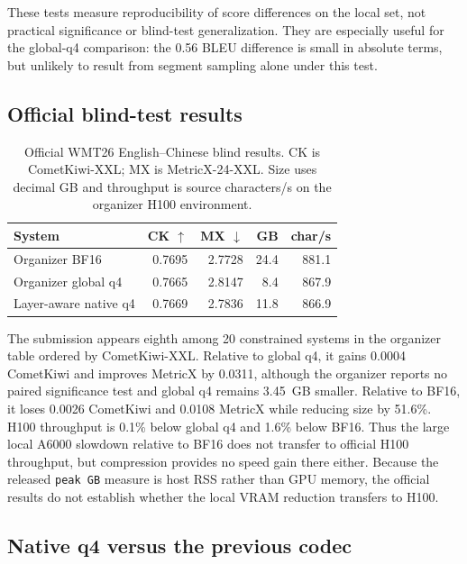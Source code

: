 \documentclass[11pt]{article}
\begin{document}
These tests measure reproducibility of score differences on the local set, not practical significance or blind-test generalization. They are especially useful for the global-q4 comparison: the 0.56 BLEU difference is small in absolute terms, but unlikely to result from segment sampling alone under this test.

\subsection{Official blind-test results}
\label{sec:official-results}

\begin{table}[t]
\centering
\small
\begin{tabular}{@{}lrrrr@{}}
\toprule
System & CK $\uparrow$ & MX $\downarrow$ & GB & char/s \\
\midrule
Organizer BF16 & 0.7695 & 2.7728 & 24.4 & 881.1 \\
Organizer global q4 & 0.7665 & 2.8147 & 8.4 & 867.9 \\
Layer-aware native q4 & 0.7669 & 2.7836 & 11.8 & 866.9 \\
\bottomrule
\end{tabular}
\caption{Official WMT26 English--Chinese blind results. CK is CometKiwi-XXL; MX is MetricX-24-XXL. Size uses decimal GB and throughput is source characters/s on the organizer H100 environment.}
\label{tab:official-results}
\end{table}

The submission appears eighth among 20 constrained systems in the organizer table ordered by CometKiwi-XXL. Relative to global q4, it gains 0.0004 CometKiwi and improves MetricX by 0.0311, although the organizer reports no paired significance test and global q4 remains 3.45~GB smaller. Relative to BF16, it loses 0.0026 CometKiwi and 0.0108 MetricX while reducing size by 51.6\%. H100 throughput is 0.1\% below global q4 and 1.6\% below BF16. Thus the large local A6000 slowdown relative to BF16 does not transfer to official H100 throughput, but compression provides no speed gain there either. Because the released \texttt{peak GB} measure is host RSS rather than GPU memory, the official results do not establish whether the local VRAM reduction transfers to H100.

\subsection{Native q4 versus the previous codec}
\end{document}
